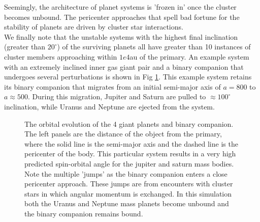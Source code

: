 \documentclass{aastex631}
\begin{document}
Seemingly, the architecture of planet systems is 'frozen in' once the cluster becomes unbound. The pericenter approaches 
that spell bad fortune for the stability of planets are driven by cluster star interactions. \\
\indent We finally note that the unstable systems with the highest final inclination (greater than $20^{\circ}$) of the surviving planets
all have greater than 10 instances of cluster members approaching within $1e4$au of the primary. An example system with an extremely inclined
inner gas giant pair and a binary companion that undergoes several perturbations is shown in Fig \ref{fig:stepbinary}. This example system retains its binary companion that
migrates from an initial semi-major axis of $a=800$ to $a\approx 500$.
During this migration, Jupiter and Saturn are pulled to $\approx 100^{\circ}$ inclination, while Uranus and Neptune are ejected from the system.

\begin{figure}
    \caption{The orbital evolution of the 4 giant planets and binary companion. The left panels are the distance of the object from the primary,
    where the solid line is the semi-major axis and the dashed line is the pericenter of the body. This particular system results in a very high
    predicted spin-orbital angle for the jupiter and saturn mass bodies. Note the multiple 'jumps' as the binary companion 
    enters a close pericenter approach. These jumps are from encounters with cluster stars in which angular momentum is exchanged. In this
    simulation both the Uranus and Neptune mass planets become unbound and the binary companion remains bound.}
    \label{fig:stepbinary}
\end{figure}
\end{document}
